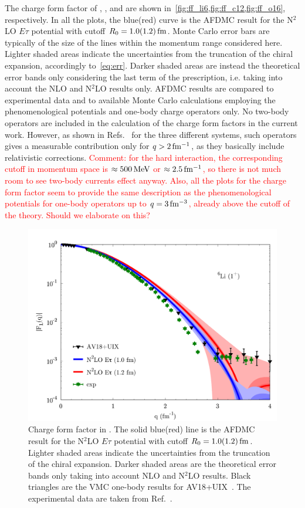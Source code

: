 \documentclass[aps,prc,twocolumn,superscriptaddress,floatfix]{revtex4-1}
\newcommand{\red}[1]{\protect\textcolor{red}{#1}}
\begin{document}
The charge form factor of , , and  are shown 
in~\cref{fig:ff_li6,fig:ff_c12,fig:ff_o16}, respectively. In all the plots, the blue(red) curve
is the AFDMC result for the N$^2$LO $E\tau$ potential with cutoff $R_0=1.0(1.2)\,\rm fm$.
Monte Carlo error bars are typically of the size of the lines within the momentum 
range considered here. Lighter shaded areas indicate the uncertainties from 
the truncation of the chiral expansion, accordingly to~\cref{eq:err}.
Darker shaded areas are instead the theoretical error bands only considering the last
term of the prescription, i.e. taking into account the NLO and N$^2$LO results only.
AFDMC results are compared to experimental data and to available Monte
Carlo calculations employing the phenomenological potentials and one-body charge operators only.
No two-body operators are included in the calculation of the charge form factors in the 
current work. However, as shown in Refs.~\cite{Wiringa:1998,Lovato:2013,Mihaila:2000} for the three
different systems, such operators gives a measurable contribution only 
for $q>2\,\rm fm^{-1}$, as they basically include relativistic corrections.
\red{Comment: for the hard interaction, the corresponding cutoff in momentum space is 
$\approx 500\,\rm MeV$ or $\approx2.5\,\rm fm^{-1}$, so there is not much room to see 
two-body currents effect anyway. Also, all the plots for the charge form factor seem to provide 
the same description as the phenomenological potentials for one-body operators up to
$q=3\,\rm fm^{-3}$, already above the cutoff of the theory. Should we elaborate on this?}

\begin{figure}[htb]
\includegraphics[width=\linewidth]{ff_li6.pdf}
\caption[]{Charge form factor in . The solid blue(red) line is the AFDMC result for the
N$^2$LO $E\tau$ potential with cutoff $R_0=1.0(1.2)\,\rm fm$.
Lighter shaded areas indicate the uncertainties from the truncation of the chiral expansion.
Darker shaded areas are the theoretical error bands only taking into account NLO and N$^2$LO results. 
Black triangles are the VMC one-body results for AV18+UIX~\cite{Wiringa:1998}.
The experimental data are taken from Ref.~\cite{Li:1971}.}
\label{fig:ff_li6}
\end{figure}
\end{document}
